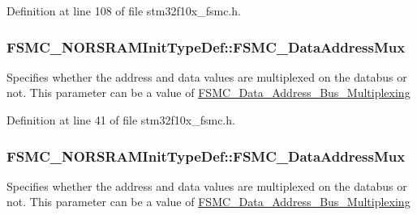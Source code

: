 Definition at line 108 of file stm32f10x\+\_\+fsmc.\+h.

\subsubsection[{\texorpdfstring{F\+S\+M\+C\+\_\+\+Data\+Address\+Mux}{FSMC_DataAddressMux}}]{ F\+S\+M\+C\+\_\+\+N\+O\+R\+S\+R\+A\+M\+Init\+Type\+Def\+::\+F\+S\+M\+C\+\_\+\+Data\+Address\+Mux}\hypertarget{struct_f_s_m_c___n_o_r_s_r_a_m_init_type_def_a50dbc279194e11059b3d5c7d60103e34}{}\label{struct_f_s_m_c___n_o_r_s_r_a_m_init_type_def_a50dbc279194e11059b3d5c7d60103e34}
Specifies whether the address and data values are multiplexed on the databus or not. This parameter can be a value of \hyperlink{group___f_s_m_c___data___address___bus___multiplexing}{F\+S\+M\+C\+\_\+\+Data\+\_\+\+Address\+\_\+\+Bus\+\_\+\+Multiplexing} 

Definition at line 41 of file stm32f10x\+\_\+fsmc.\+h.

\subsubsection[{\texorpdfstring{F\+S\+M\+C\+\_\+\+Data\+Address\+Mux}{FSMC_DataAddressMux}}]{ F\+S\+M\+C\+\_\+\+N\+O\+R\+S\+R\+A\+M\+Init\+Type\+Def\+::\+F\+S\+M\+C\+\_\+\+Data\+Address\+Mux}\hypertarget{struct_f_s_m_c___n_o_r_s_r_a_m_init_type_def_af4ff95085d3bb39e34c2f88ca3140ce5}{}\label{struct_f_s_m_c___n_o_r_s_r_a_m_init_type_def_af4ff95085d3bb39e34c2f88ca3140ce5}
Specifies whether the address and data values are multiplexed on the databus or not. This parameter can be a value of \hyperlink{group___f_s_m_c___data___address___bus___multiplexing}{F\+S\+M\+C\+\_\+\+Data\+\_\+\+Address\+\_\+\+Bus\+\_\+\+Multiplexing} 

